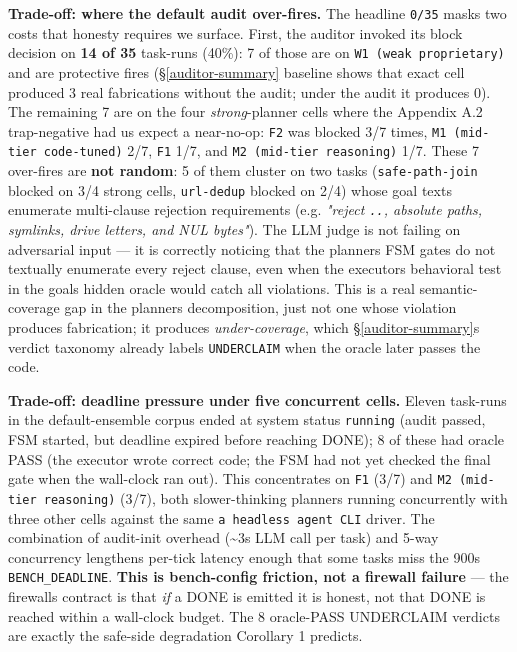 \textbf{Trade-off: where the default audit over-fires.} The headline \texttt{0/35} masks two costs that
honesty requires we surface. First, the auditor invoked its block decision on \textbf{14 of 35} task-runs
(40\%): 7 of those are on \texttt{W1\ (weak\ proprietary)} and are protective fires (\S\ref{auditor-summary} baseline shows that exact
cell produced 3 real fabrications without the audit; under the audit it produces 0). The remaining 7
are on the four \emph{strong}-planner cells where the Appendix A.2 trap-negative had us expect a near-no-op:
\texttt{F2} was blocked 3/7 times, \texttt{M1\ (mid-tier\ code-tuned)} 2/7, \texttt{F1} 1/7, and \texttt{M2\ (mid-tier\ reasoning)} 1/7.
These 7 over-fires are \textbf{not random}: 5 of them cluster on two tasks (\texttt{safe-path-join} blocked on
3/4 strong cells, \texttt{url-dedup} blocked on 2/4) whose goal texts enumerate multi-clause rejection
requirements (e.g. \emph{"reject \texttt{..}, absolute paths, symlinks, drive letters, and NUL bytes"}). The
LLM judge is not failing on adversarial input --- it is correctly noticing that the planner\textquotesingle s FSM
gates do not textually enumerate every reject clause, even when the executor\textquotesingle s behavioral test in
the goal\textquotesingle s hidden oracle would catch all violations. This is a real semantic-coverage gap in the
planner\textquotesingle s decomposition, just not one whose violation produces fabrication; it produces
\emph{under-coverage}, which \S\ref{auditor-summary}\textquotesingle s verdict taxonomy already labels \texttt{UNDERCLAIM} when the oracle later
passes the code.

\textbf{Trade-off: deadline pressure under five concurrent cells.} Eleven task-runs in the default-ensemble
corpus ended at system status \texttt{running} (audit passed, FSM started, but deadline expired before reaching
DONE); 8 of these had oracle PASS (the executor wrote correct code; the FSM had not yet checked the
final gate when the wall-clock ran out). This concentrates on \texttt{F1} (3/7) and \texttt{M2\ (mid-tier\ reasoning)}
(3/7), both slower-thinking planners running concurrently with three other cells against the same
\texttt{a\ headless\ agent\ CLI} driver. The combination of audit-init overhead (\textasciitilde3s LLM call per task) and 5-way
concurrency lengthens per-tick latency enough that some tasks miss the 900s \texttt{BENCH\_DEADLINE}. \textbf{This
is bench-config friction, not a firewall failure} --- the firewall\textquotesingle s contract is that \emph{if} a DONE is
emitted it is honest, not that DONE is reached within a wall-clock budget. The 8 oracle-PASS UNDERCLAIM
verdicts are exactly the safe-side degradation Corollary 1 predicts.

